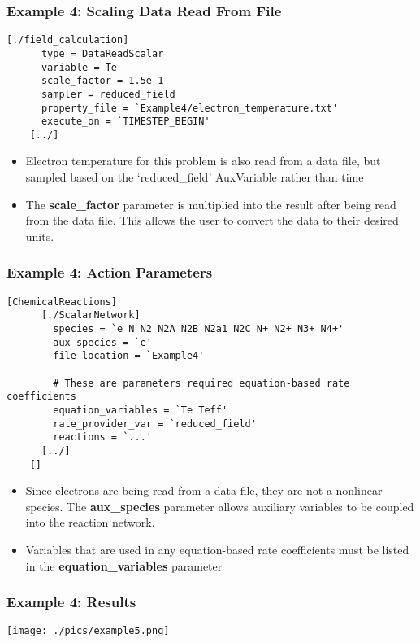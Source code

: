 \begin{frame}[fragile]
	\frametitle{Example 4: Scaling Data Read From File}
	\begin{Verbatim}[fontsize=\scriptsize]
    [./field_calculation]
      type = DataReadScalar
      variable = Te
      scale_factor = 1.5e-1
      sampler = reduced_field
      property_file = `Example4/electron_temperature.txt'
      execute_on = `TIMESTEP_BEGIN'
    [../]
	\end{Verbatim}
	\begin{itemize}
		\item Electron temperature for this problem is also read from a data file, but sampled based on the `reduced\_field' AuxVariable rather than time
		\item The \textbf{scale\_factor} parameter is multiplied into the result after being read from the data file. This allows the user to convert the data to their desired units.
	\end{itemize}
\end{frame}

\begin{frame}[fragile]
	\frametitle{Example 4: Action Parameters}
	\begin{Verbatim}[fontsize=\tiny]
    [ChemicalReactions]
      [./ScalarNetwork]
        species = `e N N2 N2A N2B N2a1 N2C N+ N2+ N3+ N4+'
        aux_species = `e'
        file_location = `Example4'

        # These are parameters required equation-based rate coefficients
        equation_variables = `Te Teff'
        rate_provider_var = `reduced_field'
        reactions = `...'
      [../]
    []
	\end{Verbatim}
	\begin{itemize}
		\item Since electrons are being read from a data file, they are not a nonlinear species. The \textbf{aux\_species} parameter allows auxiliary variables to be coupled into the reaction network.
		\item Variables that are used in any equation-based rate coefficients must be listed in the \textbf{equation\_variables} parameter
	\end{itemize}
\end{frame}

\begin{frame}
	\frametitle{Example 4: Results}
	\centering
	\texttt{[image: ./pics/example5.png]}
\end{frame}